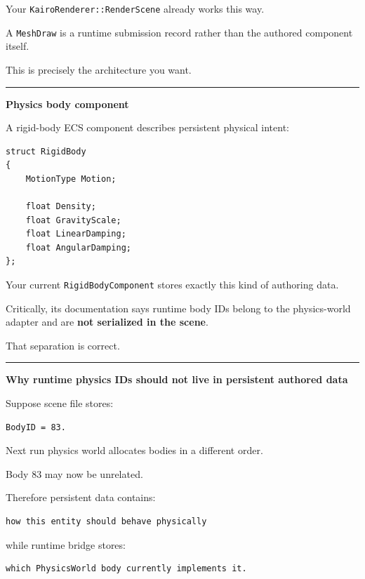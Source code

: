 Your \texttt{KairoRenderer::RenderScene} already works this way.

A \texttt{MeshDraw} is a runtime submission record rather than the authored component itself.

This is precisely the architecture you want.

\begin{center}\rule{0.5\linewidth}{0.5pt}\end{center}

\textbf{Physics body component}

A rigid-body ECS component describes persistent physical intent:

\begin{verbatim}
struct RigidBody
{
    MotionType Motion;

    float Density;
    float GravityScale;
    float LinearDamping;
    float AngularDamping;
};
\end{verbatim}

Your current \texttt{RigidBodyComponent} stores exactly this kind of authoring data.

Critically, its documentation says runtime body IDs belong to the physics-world adapter and are \textbf{not serialized in the scene}.

That separation is correct.

\begin{center}\rule{0.5\linewidth}{0.5pt}\end{center}

\textbf{Why runtime physics IDs should not live in persistent authored data}

Suppose scene file stores:

\begin{verbatim}
BodyID = 83.
\end{verbatim}

Next run physics world allocates bodies in a different order.

Body 83 may now be unrelated.

Therefore persistent data contains:

\begin{verbatim}
how this entity should behave physically
\end{verbatim}

while runtime bridge stores:

\begin{verbatim}
which PhysicsWorld body currently implements it.
\end{verbatim}

